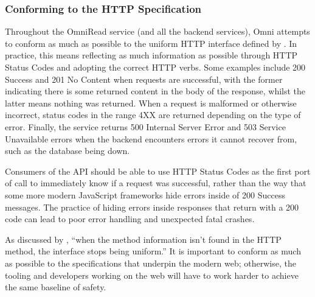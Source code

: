

\subsubsection{Conforming to the HTTP Specification}
Throughout the OmniRead service (and all the backend services), Omni attempts to conform as much as possible to the uniform HTTP interface defined by \citeauthor{fielding1999rfc2616}.
In practice, this means reflecting as much information as possible through HTTP Status Codes and adopting the correct HTTP verbs.
Some examples include 200 Success and 201 No Content when requests are successful, with the former indicating there is some returned content in the body of the response, whilst the latter means nothing was returned.
When a request is malformed or otherwise incorrect, status codes in the range 4XX are returned depending on the type of error.
Finally, the service returns 500 Internal Server Error and 503 Service Unavailable errors when the backend encounters errors it cannot recover from, such as the database being down. 

Consumers of the API should be able to use HTTP Status Codes as the first port of call to immediately know if a request was successful, rather than the way that some more modern JavaScript frameworks hide errors inside of 200 Success messages.
The practice of hiding errors inside responses that return with a 200 code can lead to poor error handling and unexpected fatal crashes.

As discussed by \citeauthor{richardson2008restful}, ``when the method information isn’t found in the HTTP method, the interface stops being uniform.''
It is important to conform as much as possible to the specifications that underpin the modern web; otherwise, the tooling and developers working on the web will have to work harder to achieve the same baseline of safety.
